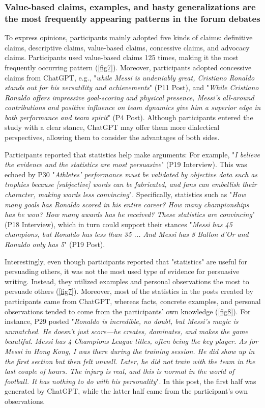 \subsubsection{Value-based claims, examples, and hasty generalizations are the most frequently appearing patterns in the forum debates}

To express opinions, participants mainly adopted five kinds of claims: definitive claims, descriptive claims, value-based claims, concessive claims, and advocacy claims. Participants used value-based claims 125 times, making it the most frequently occurring pattern (\autoref{fig7}). Moreover, participants adopted concessive claims from ChatGPT, e.g., "\textit{while Messi is undeniably great, Cristiano Ronaldo stands out for his versatility and achievements}" (P11 Post), and "\textit{While Cristiano Ronaldo offers impressive goal-scoring and physical presence, Messi's all-around contributions and positive influence on team dynamics give him a superior edge in both performance and team spirit}" (P4 Post). Although participants entered the study with a clear stance, ChatGPT may offer them more dialectical perspectives, allowing them to consider the advantages of both sides.


Participants reported that statistics help make arguments: For example, "\textit{I believe the evidence and the statistics are most persuasive}" (P19 Interview). This was echoed by P30 "\textit{Athletes' performance must be validated by objective data such as trophies because [subjective] words can be fabricated, and fans can embellish their character, making words less convincing}". Specifically, statistics such as "\textit{How many goals has Ronaldo scored in his entire career? How many championships has he won? How many awards has he received? These statistics are convincing}" (P18 Interview), which in turn could support their stances "\textit{Messi has 45 champions, but Ronaldo has less than 35 ... And Messi has 8 Ballon d'Or and Ronaldo only has 5}" (P19 Post).

Interestingly, even though participants reported that "statistics" are useful for persuading others, it was not the most used type of evidence for persuasive writing. Instead, they utilized examples and personal observations the most to persuade others (\autoref{fig7}). Moreover, most of the statistics in the posts created by participants came from ChatGPT, whereas facts, concrete examples, and personal observations tended to come from the participants' own knowledge (\autoref{fig8}). For instance, P29 posted "\textit{Ronaldo is incredible, no doubt, but Messi's magic is unmatched. He doesn't just score—he creates, dominates, and makes the game beautiful. Messi has 4 Champions League titles, often being the key player. As for Messi in Hong Kong, I was there during the training session. He did show up in the first section but then felt unwell. Later, he did not train with the team in the last couple of hours. The injury is real, and this is normal in the world of football. It has nothing to do with his personality}". In this post, the first half was generated by ChatGPT, while the latter half came from the participant's own observations.

